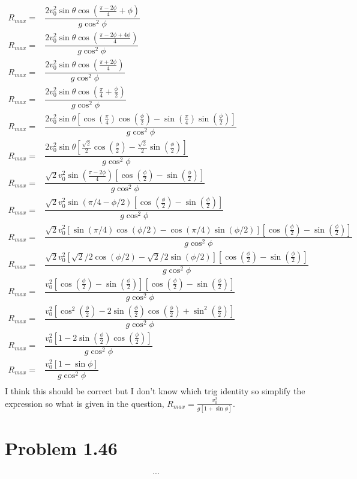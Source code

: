 \documentclass[12pt, a4paper]{article}
\begin{document}
\begin{align*}
R_{max} =& \dfrac{2v_0^2\sin\theta\cos(\frac{\pi-2\phi}{4}+\phi)}{g\cos^2\phi}
\\
R_{max} =& \dfrac{2v_0^2\sin\theta\cos(\frac{\pi-2\phi+4\phi}{4})}{g\cos^2\phi}
\\
R_{max} =& \dfrac{2v_0^2\sin\theta\cos(\frac{\pi+2\phi}{4})}{g\cos^2\phi}
\\
R_{max} =& \dfrac{2v_0^2\sin\theta\cos(
\frac{\pi}{4} + 
\frac{\phi}{2}
)}{g\cos^2\phi}
\\
R_{max} =& \dfrac{2v_0^2\sin\theta
[\cos(\frac{\pi}{4})
\cos(\frac{\phi}{2}) -
\sin(\frac{\pi}{4})
\sin(\frac{\phi}{2})]
}{g\cos^2\phi}
\\
R_{max} =& \dfrac{2v_0^2\sin\theta
[\frac{\sqrt{2}}{2}
\cos(\frac{\phi}{2}) -
\frac{\sqrt{2}}{2}
\sin(\frac{\phi}{2})]
}{g\cos^2\phi}
\\
R_{max} =& \dfrac{\sqrt{2}v_0^2\sin(\frac{\pi-2\phi}{4})
[\cos(\frac{\phi}{2}) - \sin(\frac{\phi}{2})]
}{g\cos^2\phi}
\\
R_{max} =& \dfrac{\sqrt{2}v_0^2
\sin(\pi/4-\phi/2)
[\cos(\frac{\phi}{2}) - \sin(\frac{\phi}{2})]
}{g\cos^2\phi}
\\
R_{max} =& \dfrac{\sqrt{2}v_0^2
[\sin(\pi/4)
\cos(\phi/2) -
\cos(\pi/4)
\sin(\phi/2)]
[\cos(\frac{\phi}{2}) - \sin(\frac{\phi}{2})]
}{g\cos^2\phi}
\\
R_{max} =& \dfrac{\sqrt{2}v_0^2
[\sqrt{2}/2
\cos(\phi/2) -
\sqrt{2}/2
\sin(\phi/2)]
[\cos(\frac{\phi}{2}) - \sin(\frac{\phi}{2})]
}{g\cos^2\phi}
\\
R_{max} =& \dfrac{v_0^2
[\cos(\frac{\phi}{2}) - \sin(\frac{\phi}{2})]
[\cos(\frac{\phi}{2}) - \sin(\frac{\phi}{2})]
}{g\cos^2\phi}
\\
R_{max} =& \dfrac{v_0^2
[\cos^2(\frac{\phi}{2}) - 2\sin(\frac{\phi}{2})\cos(\frac{\phi}{2})+
\sin^2(\frac{\phi}{2})]
}{g\cos^2\phi}
\\
R_{max} =& \dfrac{v_0^2
[1 - 2\sin(\frac{\phi}{2})\cos(\frac{\phi}{2})]
}{g\cos^2\phi}
\\
R_{max} =& \dfrac{v_0^2
[1 - \sin\phi]
}{g\cos^2\phi}
\\
\end{align*}
I think this should be correct but I don't know which trig identity so simplify the expression so what is given in the question, $R_{max} = \frac{v_0^2}{g[1+\sin\phi]}$. 




\pagebreak
\section*{Problem 1.46}
\begin{align*}
...
\end{align*}
\end{document}
